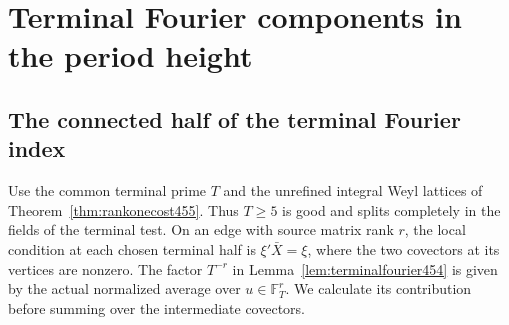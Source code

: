 \documentclass[a4paper,11pt]{article}
\theoremstyle{definition}
\theoremstyle{remark}
\numberwithin{equation}{section}
\begin{document}
\section{Terminal Fourier components in the period height}\label{nav:chapter-terminal-fourier-heights}

\subsection{The connected half of the terminal Fourier index}
\label{sec:terminalhalf496}

Use the common terminal prime \(T\) and the unrefined integral
Weyl lattices of Theorem~\ref{thm:rankonecost455}. Thus \(T\ge5\)
is good and splits completely in the fields of the terminal test.
On an edge with source matrix rank \(r\), the local condition at
each chosen terminal half is \(\xi'\bar X=\xi\), where the two
covectors at its vertices are nonzero. The factor \(T^{-r}\)
in Lemma~\ref{lem:terminalfourier454} is given by the actual
normalized average over \(u\in\mathbb F_T^r\). We calculate its
contribution before summing over the intermediate covectors.
\end{document}
